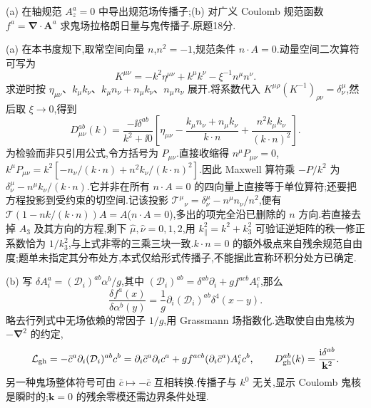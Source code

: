 \begin{exercise}
(a) 在轴规范 $A_z^a=0$ 中导出规范场传播子;(b) 对广义 Coulomb 规范函数 $f^a=\boldsymbol\nabla\cdot\mathbf A^a$ 求鬼场拉格朗日量与鬼传播子.原题18分.
\end{exercise}
\begin{solution}
(a) 在本书度规下,取常空间向量 $n$,$n^2=-1$,规范条件 $n\cdot A=0$.动量空间二次算符可写为
\[
K^{\mu\nu}=-k^2\eta^{\mu\nu}+k^\mu k^\nu-\xi^{-1}n^\mu n^\nu.
\]
求逆时按 $\eta_{\mu\nu}$、$k_\mu k_\nu$、$k_\mu n_\nu+n_\mu k_\nu$、$n_\mu n_\nu$ 展开.将系数代入 $K^{\mu\rho}(K^{-1})_{\rho\nu}=\delta^\mu_\nu$,然后取 $\xi\to0$,得到
\[
D_{\mu\nu}^{ab}(k)=\frac{-\ii\delta^{ab}}{k^2+\ii0}
\left[\eta_{\mu\nu}-\frac{k_\mu n_\nu+n_\mu k_\nu}{k\cdot n}
+\frac{n^2k_\mu k_\nu}{(k\cdot n)^2}\right].
\]
为检验而非只引用公式,令方括号为 $P_{\mu\nu}$.直接收缩得 $n^\mu P_{\mu\nu}=0$,$k^\mu P_{\mu\nu}=k^2[-n_\nu/(k\cdot n)+n^2k_\nu/(k\cdot n)^2]$.因此 Maxwell 算符乘 $-P/k^2$ 为 $\delta^\mu_\nu-n^\mu k_\nu/(k\cdot n)$.它并非在所有 $n\cdot A=0$ 的四向量上直接等于单位算符;还要把方程投影到受约束的切空间.记该投影 $\mathcal T^\mu{}_{\nu}=\delta^\mu_\nu-n^\mu n_\nu/n^2$,便有 $\mathcal T(1-nk/(k\cdot n))A=A$($n\cdot A=0$),多出的项完全沿已删除的 $n$ 方向.若直接去掉 $A_3$ 及其方向的方程,剩下 $\widehat\mu,\widehat\nu=0,1,2$,用 $k_\parallel^2=k^2+k_3^2$ 可验证逆矩阵的秩一修正系数恰为 $1/k_3^2$,与上式非零的三乘三块一致.$k\cdot n=0$ 的额外极点来自残余规范自由度;题单未指定其分布处方,本式仅给形式传播子,不能据此宣称环积分处方已确定.

(b) 写 $\delta A_i^a=(\mathcal D_i)^{ab}\alpha^b/g$,其中 $(\mathcal D_i)^{ab}=\delta^{ab}\partial_i+gf^{acb}A_i^c$,那么
\[
\frac{\delta f^a(x)}{\delta\alpha^b(y)}
=\frac1g\partial_i(\mathcal D_i)^{ab}\delta^4(x-y).
\]
略去行列式中无场依赖的常因子 $1/g$,用 Grassmann 场指数化.选取使自由鬼核为 $-\boldsymbol\nabla^2$ 的约定,
\[
\mathcal L_{\rm gh}=-\bar c^a\partial_i(\mathcal D_i)^{ab}c^b
=\partial_i\bar c^a\partial_i c^a
+gf^{acb}(\partial_i\bar c^a)A_i^c c^b,
\qquad D_{\rm gh}^{ab}(k)=\frac{\mathrm i\delta^{ab}}{\mathbf k^2}.
\]
另一种鬼场整体符号可由 $\bar c\mapsto-\bar c$ 互相转换.传播子与 $k^0$ 无关,显示 Coulomb 鬼核是瞬时的;$\mathbf k=0$ 的残余零模还需边界条件处理.
\end{solution}
